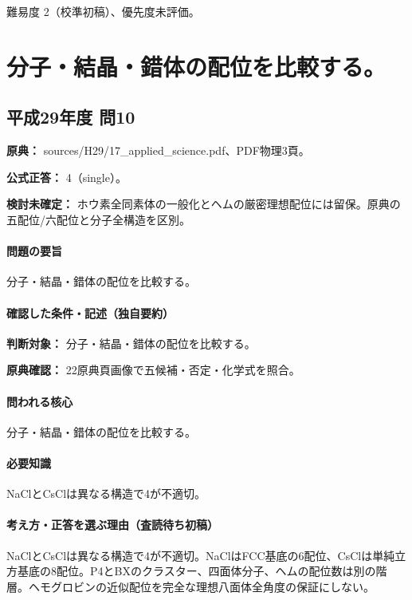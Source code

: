 \par 難易度 2（校準初稿）、優先度未評価。

\section{分子・結晶・錯体の配位を比較する。}

\subsection{平成29年度 問10}
\label{q:h29-reg-applied-10}

\noindent\textbf{原典：} sources/H29/17\_applied\_science.pdf、PDF物理3頁。

\textbf{公式正答：} 4（single）。

\par\textbf{検討未確定：} ホウ素全同素体の一般化とヘムの厳密理想配位には留保。原典の五配位/六配位と分子全構造を区別。

\paragraph{問題の要旨} 分子・結晶・錯体の配位を比較する。

\paragraph{確認した条件・記述（独自要約）}\mbox{}\par

\noindent\textbf{判断対象：} 分子・結晶・錯体の配位を比較する。\par

\noindent\textbf{原典確認：} 22原典頁画像で五候補・否定・化学式を照合。\par

\paragraph{問われる核心} 分子・結晶・錯体の配位を比較する。

\paragraph{必要知識} NaClとCsClは異なる構造で4が不適切。

\paragraph{考え方・正答を選ぶ理由（査読待ち初稿）} NaClとCsClは異なる構造で4が不適切。NaClはFCC基底の6配位、CsClは単純立方基底の8配位。P4とBXのクラスター、四面体分子、ヘムの配位数は別の階層。ヘモグロビンの近似配位を完全な理想八面体全角度の保証にしない。

